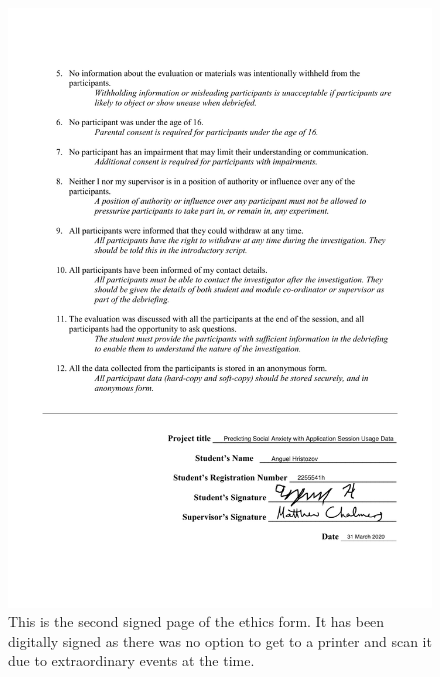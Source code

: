 \documentclass{l4proj}
\begin{document}
\begin{appendices}
\begin{figure}[htb]
    \centering
    \includegraphics[width=\linewidth]{images/signed_ethics_form_2-end.pdf}
    \caption{This is the second signed page of the ethics form. It has been digitally signed as there was no option to get to a printer and scan it due to extraordinary events at the time.}
    \label{fig:ethics_form_2} 
\end{figure}

\end{appendices}





\renewcommand{\thechapter}{0} 

\end{document}
